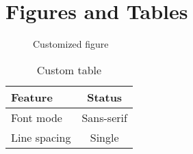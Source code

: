 \documentclass[
    language=english,
    institution=none,        %
    oneside,                 %
    loadGlossaries,          %
]{../../omnilatex}
\begin{document}
\chapter{Figures and Tables}

\begin{figure}[htbp]
    \centering
    \caption{Customized figure}
    \label{fig:custom}
\end{figure}

\begin{table}[htbp]
    \centering
    \caption{Custom table}
    \begin{tabular}{lc}
        \toprule
        \textbf{Feature} & \textbf{Status} \\
        \midrule
        Font mode        & Sans-serif      \\
        Line spacing     & Single          \\
        \bottomrule
    \end{tabular}
\end{table}

\printbibliography
\end{document}
